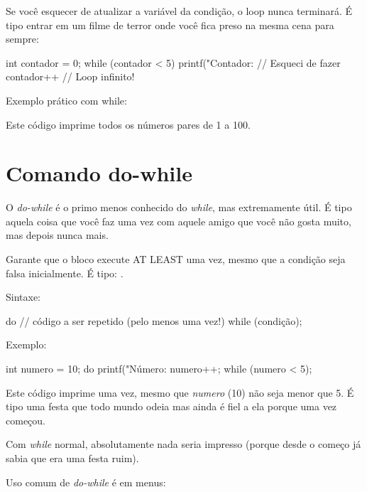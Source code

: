 Se você esquecer de atualizar a variável da condição, o loop nunca terminará. É tipo entrar em um filme de terror onde você fica preso na mesma cena para sempre:

\begin{ccode}
  int contador = 0;
  while (contador < 5) {
    printf("Contador: %
    // Esqueci de fazer contador++
    // Loop infinito!
  }
\end{ccode}

Exemplo prático com while:


Este código imprime todos os números pares de 1 a 100.

\section{Comando do-while}

O \textit{do-while} é o primo menos conhecido do \textit{while}, mas extremamente útil. É tipo aquela coisa que você faz uma vez com aquele amigo que você não gosta muito, mas depois nunca mais.

Garante que o bloco execute AT LEAST uma vez, mesmo que a condição seja falsa inicialmente. É tipo: .

Sintaxe:

\begin{ccode}
  do {
    // código a ser repetido (pelo menos uma vez!)
  } while (condição);
\end{ccode}

Exemplo:

\begin{ccode}
  int numero = 10;
  do {
    printf("Número: %
    numero++;
  } while (numero < 5);
\end{ccode}

Este código imprime  uma vez, mesmo que \textit{numero} (10) não seja menor que 5. É tipo uma festa que todo mundo odeia mas ainda é fiel a ela porque uma vez começou.

Com \textit{while} normal, absolutamente nada seria impresso (porque desde o começo já sabia que era uma festa ruim).

Uso comum de \textit{do-while} é em menus:


